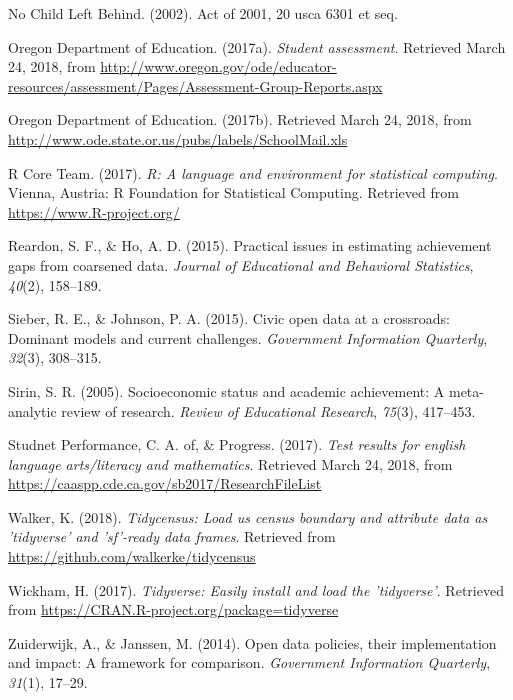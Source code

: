 \documentclass[man, fleqn, noextraspace]{apa6}
\theoremstyle{definition}
\theoremstyle{definition}
\theoremstyle{definition}
\theoremstyle{remark}
\begin{document}
\leavevmode\hypertarget{ref-nclb02}{}%
No Child Left Behind. (2002). Act of 2001, 20 usca 6301 et seq.

\leavevmode\hypertarget{ref-or17a}{}%
Oregon Department of Education. (2017a). \emph{Student assessment}.
Retrieved March 24, 2018, from
\url{http://www.oregon.gov/ode/educator-resources/assessment/Pages/Assessment-Group-Reports.aspx}

\leavevmode\hypertarget{ref-or17b}{}%
Oregon Department of Education. (2017b). Retrieved March 24, 2018, from
\url{http://www.ode.state.or.us/pubs/labels/SchoolMail.xls}

\leavevmode\hypertarget{ref-r}{}%
R Core Team. (2017). \emph{R: A language and environment for statistical
computing}. Vienna, Austria: R Foundation for Statistical Computing.
Retrieved from \url{https://www.R-project.org/}

\leavevmode\hypertarget{ref-reardon15}{}%
Reardon, S. F., \& Ho, A. D. (2015). Practical issues in estimating
achievement gaps from coarsened data. \emph{Journal of Educational and
Behavioral Statistics}, \emph{40}(2), 158--189.

\leavevmode\hypertarget{ref-sieber15}{}%
Sieber, R. E., \& Johnson, P. A. (2015). Civic open data at a
crossroads: Dominant models and current challenges. \emph{Government
Information Quarterly}, \emph{32}(3), 308--315.

\leavevmode\hypertarget{ref-sirin05}{}%
Sirin, S. R. (2005). Socioeconomic status and academic achievement: A
meta-analytic review of research. \emph{Review of Educational Research},
\emph{75}(3), 417--453.

\leavevmode\hypertarget{ref-ca17a}{}%
Studnet Performance, C. A. of, \& Progress. (2017). \emph{Test results
for english language arts/literacy and mathematics}. Retrieved March 24,
2018, from \url{https://caaspp.cde.ca.gov/sb2017/ResearchFileList}

\leavevmode\hypertarget{ref-tidycensus}{}%
Walker, K. (2018). \emph{Tidycensus: Load us census boundary and
attribute data as 'tidyverse' and 'sf'-ready data frames}. Retrieved
from \url{https://github.com/walkerke/tidycensus}

\leavevmode\hypertarget{ref-tidyverse}{}%
Wickham, H. (2017). \emph{Tidyverse: Easily install and load the
'tidyverse'}. Retrieved from
\url{https://CRAN.R-project.org/package=tidyverse}

\leavevmode\hypertarget{ref-zuiderwijk14}{}%
Zuiderwijk, A., \& Janssen, M. (2014). Open data policies, their
implementation and impact: A framework for comparison. \emph{Government
Information Quarterly}, \emph{31}(1), 17--29.

\endgroup
\end{document}
